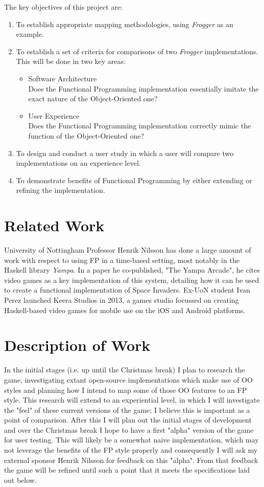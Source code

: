 \documentclass[12pt, a4paper]{report}
\begin{document}
The key objectives of this project are:
\begin{enumerate}
  \item To establish appropriate mapping methodologies, using \textit{Frogger} as an example.
  \item To establish a set of criteria for comparisons of two \textit{Frogger} implementations.\\
        This will be done in two key areas:
    \begin{itemize}
      \item Software Architecture\\
        Does the Functional Programming implementation essentially imitate the exact nature of the Object-Oriented one?
      \item User Experience\\
        Does the Functional Programming implementation correctly mimic the function of the Object-Oriented one?
    \end{itemize}
  \item To design and conduct a user study in which a user will compare two implementations on an experience level.
  \item To demonstrate benefits of Functional Programming by either extending or refining the implementation.
\end{enumerate}

\section{Related Work}
University of Nottingham Professor Henrik Nilsson has done a large amount of work with respect to using FP in a time-based setting, most notably in the Haskell library \textit{Yampa}.
In a paper he co-published, "The Yampa Arcade"\cite{yampaarcade}, he cites video games as a key implementation of this system, detailing how it can be used to create a functional implementation of Space Invaders.
Ex-UoN student Ivan Perez launched Keera Studios in 2013, a games studio focussed on creating Haskell-based video games for mobile use on the iOS and Android platforms.


\section{Description of Work}
In the initial stages (i.e. up until the Christmas break) I plan to research the game, investigating extant open-source implementations which make use of OO styles and planning how I intend to map some of those OO features to an FP style.
This research will extend to an experiential level, in which I will investigate the "feel" of these current versions of the game; I believe this is important as a point of comparison.
After this I will plan out the initial stages of development and over the Christmas break I hope to have a first "alpha" version of the game for user testing.
This will likely be a somewhat naive implementation, which may not leverage the benefits of the FP style properly and consequently I will ask my external sponsor Henrik Nilsson for feedback on this "alpha".
From that feedback the game will be refined until such a point that it meets the specifications laid out below.
\end{document}
